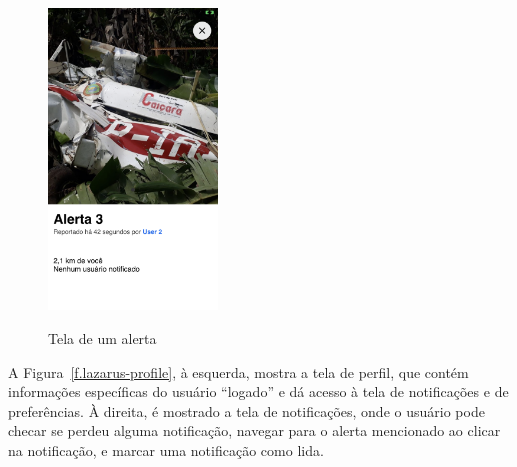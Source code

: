 \begin{figure}[htbp]
	\caption{\small Tela de um alerta} 
	\centering
	\includegraphics[height=8cm]{images/lazarus-incident.png}
	\label{f.lazarus-incident}
\end{figure}

\FloatBarrier

A Figura~\ref{f.lazarus-profile}, à esquerda, mostra a tela de perfil, que contém informações específicas do usuário ``logado'' e dá acesso à tela de notificações e de preferências. À direita, é mostrado a tela de notificações, onde o usuário pode checar se perdeu alguma notificação, navegar para o alerta mencionado ao clicar na notificação, e marcar uma notificação como lida.

